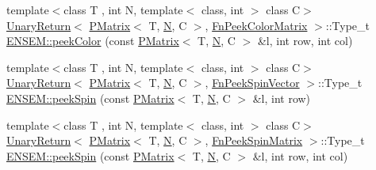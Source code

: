 \begin{DoxyCompactItemize}
{\footnotesize template$<$class T , int N, template$<$ class, int $>$ class C$>$ }\\\mbox{\hyperlink{structENSEM_1_1UnaryReturn}{Unary\+Return}}$<$ \mbox{\hyperlink{classENSEM_1_1PMatrix}{P\+Matrix}}$<$ T, \mbox{\hyperlink{adat__devel_2lib_2hadron_2operator__name__util_8cc_a7722c8ecbb62d99aee7ce68b1752f337}{N}}, C $>$, \mbox{\hyperlink{structENSEM_1_1FnPeekColorMatrix}{Fn\+Peek\+Color\+Matrix}} $>$\+::Type\+\_\+t \mbox{\hyperlink{group__primmatrix_gaa9e8d0698d08d9e4b6924a14192c17b4}{E\+N\+S\+E\+M\+::peek\+Color}} (const \mbox{\hyperlink{classENSEM_1_1PMatrix}{P\+Matrix}}$<$ T, \mbox{\hyperlink{adat__devel_2lib_2hadron_2operator__name__util_8cc_a7722c8ecbb62d99aee7ce68b1752f337}{N}}, C $>$ \&l, int row, int col)
\item 
{\footnotesize template$<$class T , int N, template$<$ class, int $>$ class C$>$ }\\\mbox{\hyperlink{structENSEM_1_1UnaryReturn}{Unary\+Return}}$<$ \mbox{\hyperlink{classENSEM_1_1PMatrix}{P\+Matrix}}$<$ T, \mbox{\hyperlink{adat__devel_2lib_2hadron_2operator__name__util_8cc_a7722c8ecbb62d99aee7ce68b1752f337}{N}}, C $>$, \mbox{\hyperlink{structENSEM_1_1FnPeekSpinVector}{Fn\+Peek\+Spin\+Vector}} $>$\+::Type\+\_\+t \mbox{\hyperlink{group__primmatrix_gaf26619f85146d483d1c177abf5c2f476}{E\+N\+S\+E\+M\+::peek\+Spin}} (const \mbox{\hyperlink{classENSEM_1_1PMatrix}{P\+Matrix}}$<$ T, \mbox{\hyperlink{adat__devel_2lib_2hadron_2operator__name__util_8cc_a7722c8ecbb62d99aee7ce68b1752f337}{N}}, C $>$ \&l, int row)
\item 
{\footnotesize template$<$class T , int N, template$<$ class, int $>$ class C$>$ }\\\mbox{\hyperlink{structENSEM_1_1UnaryReturn}{Unary\+Return}}$<$ \mbox{\hyperlink{classENSEM_1_1PMatrix}{P\+Matrix}}$<$ T, \mbox{\hyperlink{adat__devel_2lib_2hadron_2operator__name__util_8cc_a7722c8ecbb62d99aee7ce68b1752f337}{N}}, C $>$, \mbox{\hyperlink{structENSEM_1_1FnPeekSpinMatrix}{Fn\+Peek\+Spin\+Matrix}} $>$\+::Type\+\_\+t \mbox{\hyperlink{group__primmatrix_ga2efe19b2ef4dc4cbacc12117645bf8b8}{E\+N\+S\+E\+M\+::peek\+Spin}} (const \mbox{\hyperlink{classENSEM_1_1PMatrix}{P\+Matrix}}$<$ T, \mbox{\hyperlink{adat__devel_2lib_2hadron_2operator__name__util_8cc_a7722c8ecbb62d99aee7ce68b1752f337}{N}}, C $>$ \&l, int row, int col)
\item 

\end{DoxyCompactItemize}

